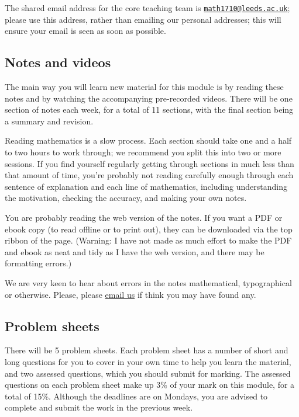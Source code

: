 \documentclass[
  a4paper,
]{book}
\theoremstyle{definition}
\theoremstyle{definition}
\theoremstyle{definition}
\theoremstyle{definition}
\theoremstyle{remark}
\begin{document}
The shared email address for the core teaching team is \href{mailto:math1710@leeds.ac.uk}{\nolinkurl{math1710@leeds.ac.uk}}; please use this address, rather than emailing our personal addresses; this will ensure your email is seen as soon as possible.

\hypertarget{notes}{%
\subsection*{Notes and videos}\label{notes}}

The main way you will learn new material for this module is by reading these notes and by watching the accompanying pre-recorded videos. There will be one section of notes each week, for a total of 11 sections, with the final section being a summary and revision.

Reading mathematics is a slow process. Each section should take one and a half to two hours to work through; we recommend you split this into two or more sessions. If you find yourself regularly getting through sections in much less than that amount of time, you're probably not reading carefully enough through each sentence of explanation and each line of mathematics, including understanding the motivation, checking the accuracy, and making your own notes.

You are probably reading the web version of the notes. If you want a PDF or ebook copy (to read offline or to print out), they can be downloaded via the top ribbon of the page. (Warning: I have not made as much effort to make the PDF and ebook as neat and tidy as I have the web version, and there may be formatting errors.)

We are very keen to hear about errors in the notes mathematical, typographical or otherwise. Please, please \href{mailto:math1710@leeds.ac.uk}{email us} if think you may have found any.

\hypertarget{problem-sheets}{%
\subsection*{Problem sheets}\label{problem-sheets}}

There will be 5 problem sheets. Each problem sheet has a number of short and long questions for you to cover in your own time to help you learn the material, and two assessed questions, which you should submit for marking. The assessed questions on each problem sheet make up 3\% of your mark on this module, for a total of 15\%. Although the deadlines are on Mondays, you are advised to complete and submit the work in the previous week.
\end{document}
